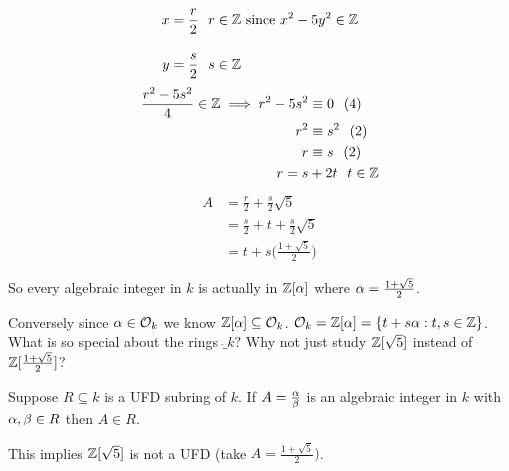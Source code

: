 \documentclass[11pt]{article}
\begin{document}
\begin{align*}
	x&= \frac{r}{2} \hspace{7pt}r \in \mathbb{Z} \text{ since }x^2-5y^2 \in \mathbb{Z} \\[1em]
	y&= \frac{s}{2} \hspace{7pt} s \in \mathbb{Z}
\end{align*}
\begin{align*}
	\frac{r^2 - 5s^2}{4} \in \mathbb{Z} \implies r^2-5s^2 &\equiv 0 \hspace{7pt} (4)\\
	r^2 &\equiv s^2 \hspace{7pt}(2)\\
	r &\equiv s \hspace{7pt} (2)\\
	r = s& +2t \hspace{7pt} t \in \mathbb{Z}
\end{align*}
\begin{align*}
	A &=\frac{r}{2}+\frac{s}{2} \sqrt{5}\\[0.5em]
	& =\frac{s}{2} + t + \frac{s}{2}\sqrt{5}\\[0.5em]
	& = t + s\bigg(\frac{1+\sqrt{5}}{2}\bigg)
\end{align*}

So every algebraic integer in $k$ is actually in $\mathbb{Z}[\alpha]$ where $\alpha = \frac{1+\sqrt{5}}{2}$.

Conversely since $\alpha \in \mathcal{O}_k$ we know $\mathbb{Z}[\alpha] \subseteq \mathcal{O}_k$. 
$\mathcal{O}_k = \mathbb{Z}[\alpha] = \{t+s\alpha : t,s \in \mathbb{Z} \}$.
\spac
What is so special about the rings $\ring_k ?$
Why not just study $\mathbb{Z}[\sqrt{5}]$ instead of $\mathbb{Z}[\frac{1+\sqrt{5}}{2}]$?



\begin{prop}
	Suppose $R \subseteq k $ is a UFD subring of $k$. If $A = \frac{\alpha}{\beta} $ is an algebraic integer in $k$ with $\alpha, \beta \in R$ then $A \in R$.
\end{prop}
\spa
	This implies $\mathbb{Z}[\sqrt{5}]$ is not a UFD (take $A = \frac{1+\sqrt{5}}{2})$.
\end{document}
